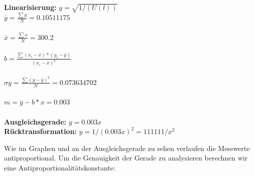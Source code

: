 \documentclass[12pt, a4paper]{article}
\begin{document}
\textbf{Linearisierung:} $y=\sqrt{1/(U(l))}$\\
$\bar y = \frac{\sum y}{N} = 0.10511175$\\\\
$\bar x = \frac{\sum x}{N} = 300.2$\\\\
$b = \frac{\sum (x_i - \bar x) * (y_i - \bar y)}{(x_i - \bar x)^2}$\\\\
$\sigma y = \frac{\sum (y - \bar y)^2}{N} = 0.073634702$\\\\
$m = \bar y - b * x = 0.003$\\\\
\textbf{Ausgleichsgerade:} $y=0.003x$\\
\textbf{Rücktransformation:} $y = 1/(0.003x)^2 = 111111 / x^2$

\vspace{5mm}
Wie im Graphen und an der Ausgleichsgerade zu sehen verlaufen die Messwerte antiproportional. Um die Genauigkeit der Gerade zu analysieren berechnen wir eine Antiproportionalitätskonstante:

\vspace{10mm}
\end{document}
